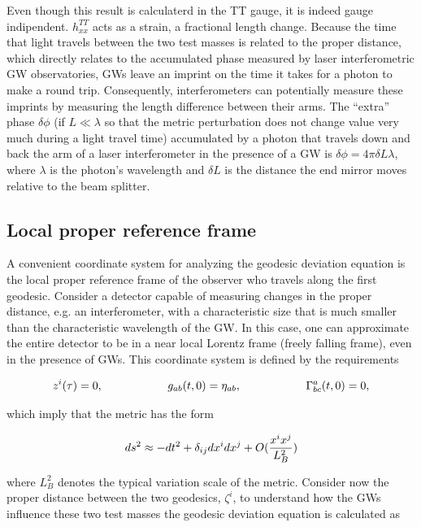 \documentclass[binding=0.6cm, LaM]{sapthesis}
\begin{document}
	Even though this result is calculaterd in the TT gauge, it is indeed gauge indipendent.
	$h_{xx}^{TT}$ acts as a strain, a fractional length change.
	Because the time that light travels between the two test masses is related to the proper distance,  
	which directly relates to the accumulated phase measured by laser interferometric GW observatories,
	GWs leave an imprint on the time it takes for a photon to make a round trip. 
	Consequently, interferometers can potentially measure these imprints by measuring the length difference between
	their arms. The “extra” phase $\delta \phi$ (if $L \ll \lambda$ so that the metric perturbation 
	does not change value very much during a light travel time) accumulated by a photon that travels
	down and back the arm of a laser interferometer in the presence of a GW is $\delta \phi = 4\pi \delta L \lambda$, 
	where $\lambda$ is the photon’s wavelength and $\delta L$ is the distance
	the end mirror moves relative to the beam splitter.


\subsection{Local proper reference frame}

	A convenient coordinate system for analyzing the geodesic deviation equation is the 
	local proper reference frame of the observer who travels along the first geodesic.
	Consider a detector capable of measuring changes in the proper distance, e.g. an interferometer, 
	with a characteristic size that is much smaller than the characteristic wavelength of the GW.
	In this case, one can approximate the entire detector to be in a near local Lorentz frame  
	(freely falling frame), even in the presence of GWs. This coordinate system is defined by the requirements

		\begin{equation}
		z^i(\tau) = 0, \hspace*{2cm} g_{ab}(t, 0) = \eta_{ab}, \hspace*{2cm} \Gamma^a_{bc}(t,0) = 0,
		\end{equation}

	which imply that the metric has the form

		\begin{equation}
		ds^2 \approx -dt^2 + \delta_{ij}dx^i dx^j + O({{x^ix^j}\over{L^2_B}})
		\end{equation}

	where $L^2_B$ denotes the typical variation scale of the metric.
	Consider now the proper distance between the two geodesics, $\zeta^i$, 
	to understand how the GWs influence these two test masses the geodesic deviation equation is calculated as
\end{document}
